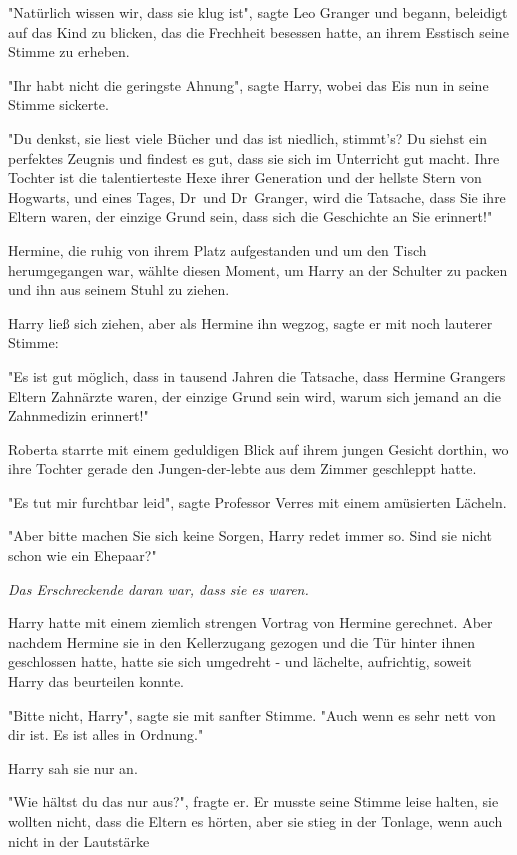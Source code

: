 {"Natürlich wissen wir, dass sie klug ist", sagte Leo Granger und begann, beleidigt auf das Kind zu blicken, das die Frechheit besessen hatte, an ihrem Esstisch seine Stimme zu erheben.

"Ihr habt nicht die geringste Ahnung", sagte Harry, wobei das Eis nun in seine Stimme sickerte.

"Du denkst, sie liest viele Bücher und das ist niedlich, stimmt's? Du siehst ein perfektes Zeugnis und findest es gut, dass sie sich im Unterricht gut macht. Ihre Tochter ist die talentierteste Hexe ihrer Generation und der hellste Stern von Hogwarts, und eines Tages, Dr~und Dr~Granger, wird die Tatsache, dass Sie ihre Eltern waren, der einzige Grund sein, dass sich die Geschichte an Sie erinnert!"

Hermine, die ruhig von ihrem Platz aufgestanden und um den Tisch herumgegangen war, wählte diesen Moment, um Harry an der Schulter zu packen und ihn aus seinem Stuhl zu ziehen.

Harry ließ sich ziehen, aber als Hermine ihn wegzog, sagte er mit noch lauterer Stimme:

"Es ist gut möglich, dass in tausend Jahren die Tatsache, dass Hermine Grangers Eltern Zahnärzte waren, der einzige Grund sein wird, warum sich jemand an die Zahnmedizin erinnert!"

Roberta starrte mit einem geduldigen Blick auf ihrem jungen Gesicht dorthin, wo ihre Tochter gerade den Jungen-der-lebte aus dem Zimmer geschleppt hatte.

"Es tut mir furchtbar leid", sagte Professor Verres mit einem amüsierten Lächeln.

"Aber bitte machen Sie sich keine Sorgen, Harry redet immer so. Sind sie nicht schon wie ein Ehepaar?"

\emph{Das Erschreckende daran war, dass sie es waren.}

Harry hatte mit einem ziemlich strengen Vortrag von Hermine gerechnet. Aber nachdem Hermine sie in den Kellerzugang gezogen und die Tür hinter ihnen geschlossen hatte, hatte sie sich umgedreht - und lächelte, aufrichtig, soweit Harry das beurteilen konnte.

"Bitte nicht, Harry", sagte sie mit sanfter Stimme. "Auch wenn es sehr nett von dir ist. Es ist alles in Ordnung."

Harry sah sie nur an.

"Wie hältst du das nur aus?", fragte er. Er musste seine Stimme leise halten, sie wollten nicht, dass die Eltern es hörten, aber sie stieg in der Tonlage, wenn auch nicht in der Lautstärke

}
